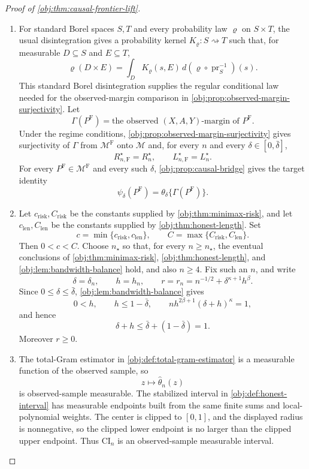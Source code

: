 \begin{proof}[Proof of \cref{obj:thm:causal-frontier-lift}]
\begin{enumerate}
\item For standard Borel spaces \(S,T\) and every probability law \(\varrho\) on
\(S\times T\), the usual disintegration gives a probability kernel
\(K_\varrho:S\rightsquigarrow T\) such that, for measurable
\(D\subseteq S\) and \(E\subseteq T\),
\[
\varrho(D\times E)
=
\int_D K_\varrho(s,E)\,d(\varrho\circ \operatorname{pr}_S^{-1})(s).
\]
This standard Borel disintegration supplies the regular conditional law needed
for the observed-margin comparison in \cref{obj:prop:observed-margin-surjectivity}.
Let
\[
\Gamma(P^{\mathrm F})
=
\text{the observed }(X,A,Y)\text{-margin of }P^{\mathrm F}.
\]
Under the regime conditions, \cref{obj:prop:observed-margin-surjectivity} gives
surjectivity of \(\Gamma\) from \(\mathcal M^{\mathrm F}\) onto \(\mathcal M\) and,
for every \(n\) and every \(\delta\in[0,\bar\delta]\),
\[
R_{n,\mathrm F}^\star=R_n^\star,
\qquad
L_{n,\mathrm F}^\star=L_n^\star .
\]
For every \(P^{\mathrm F}\in\mathcal M^{\mathrm F}\) and every such \(\delta\),
\cref{obj:prop:causal-bridge} gives the target identity
\[
\psi_\delta(P^{\mathrm F})
=
\theta_\delta\{\Gamma(P^{\mathrm F})\}.
\]

\item Let \(c_{\mathrm{risk}},C_{\mathrm{risk}}\) be the constants supplied by
\cref{obj:thm:minimax-risk}, and let \(c_{\mathrm{len}},C_{\mathrm{len}}\)
be the constants supplied by \cref{obj:thm:honest-length}.  Set
\[
c=\min\{c_{\mathrm{risk}},c_{\mathrm{len}}\},
\qquad
C=\max\{C_{\mathrm{risk}},C_{\mathrm{len}}\}.
\]
Then \(0<c<C\).  Choose \(n_\star\) so that, for every \(n\ge n_\star\),
the eventual conclusions of \cref{obj:thm:minimax-risk},
\cref{obj:thm:honest-length}, and \cref{obj:lem:bandwidth-balance} hold, and
also \(n\ge4\).  Fix such an \(n\), and write
\[
\delta=\delta_n,
\qquad
h=h_n,
\qquad
r=r_n=n^{-1/2}+\delta^{\kappa+1}h^\beta .
\]
Since \(0\le\delta\le\bar\delta\), \cref{obj:lem:bandwidth-balance} gives
\[
0<h,
\qquad
h\le 1-\bar\delta,
\qquad
n h^{2\beta+1}(\delta+h)^\kappa=1,
\]
and hence
\[
\delta+h\le \bar\delta+(1-\bar\delta)=1.
\]
Moreover \(r\ge0\). %

\item The total-Gram estimator in \cref{obj:def:total-gram-estimator} is a
measurable function of the observed sample, so
\[
z\longmapsto
\widehat\theta_n(z)
\]
is observed-sample measurable.  The stabilized interval in
\cref{obj:def:honest-interval} has measurable endpoints built from the same
finite sums and local-polynomial weights.  The center is clipped to \([0,1]\),
and the displayed radius is nonnegative, so the clipped lower endpoint is no
larger than the clipped upper endpoint.  Thus \(\mathrm{CI}_n\) is an
observed-sample measurable interval. %


\end{enumerate}
\end{proof}

